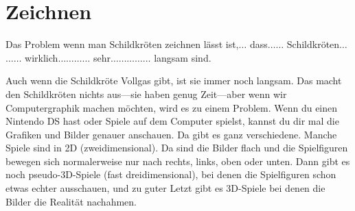 

\chapter{Zeichnen}\label{ch:abitgraphic}

Das Problem wenn man Schildkröten zeichnen lässt ist,$\ldots$ dass$\ldots$$\ldots$ Schildkröten$\ldots$$\ldots$$\ldots$ wirklich$\ldots$$\ldots$$\ldots$$\ldots$ sehr$\ldots$$\ldots$$\ldots$$\ldots$$\ldots$ langsam sind.
\par
Auch wenn die Schildkröte Vollgas gibt, ist sie immer noch langsam. Das macht den Schildkröten nichts aus---sie haben genug Zeit---aber wenn wir Computergraphik machen möchten, wird es zu einem Problem. Wenn du einen Nintendo DS hast oder Spiele auf dem Computer spielst, kannst du dir mal die Grafiken und Bilder genauer anschauen. Da gibt es ganz verschiedene. Manche Spiele sind in 2D (zweidimensional). Da sind die Bilder flach und die Spielfiguren bewegen sich normalerweise nur nach rechts, links, oben oder unten. Dann gibt es noch pseudo-3D-Spiele (fast dreidimensional), bei denen die Spielfiguren schon etwas echter ausschauen, und zu guter Letzt gibt es 3D-Spiele bei denen die Bilder die Realität nachahmen. 

